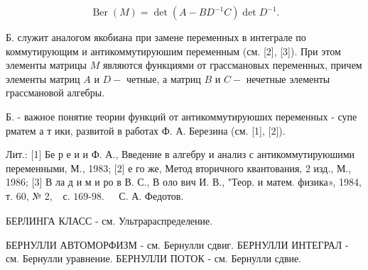 \documentclass[10pt]{article}
\begin{document}
\[

\operatorname{Ber}(M)=\operatorname{det}\left(A-B D^{-1} C\right) \operatorname{det} D^{-1} .

\]



Б. служит аналогом якобиана при замене переменных в интеграле по коммутирующим и антикоммутируюшим переменным (см. [2], [3]). При этом элементы матрицы $M$ являются функциями от грассмановых переменных, причем элементы матриц $A$ и $D-$ четные, а матриц $B$ и $C-$ нечетные элементы грассмановой алгебры.



Б. - важное понятие теории функций от антикоммутируюших переменных - супе рматем а т ики, развитой в работах Ф. А. Березина (см. [1], [2]).



Лит.: [1] Бе р е и и Ф. А., Введение в алгебру и анализ с антикоммутируюшими переменными, М., 1983; [2] е го же, Метод вторичного квантования, 2 изд., М., 1986; [3] В ла д и м и ро в В. С., В оло вич И. В., "Теор. и матем. физика», 1984, т. 60, № 2, $\begin{array}{ll}\text { с. 169-98. } & \text { С. А. Федотов. }\end{array}$



БЕРЛИНГА КЛАСС - см. Ультрараспределение.



БЕРНУЛЛИ АВТОМОРФИЗМ - см. Бернулли сдвиг. БЕРНУЛЛИ ИНТЕГРАЛ - см. Бернулли уравнение. БЕРНУЛЛИ ПОТОК - см. Бернулли сдвие.
\end{document}
